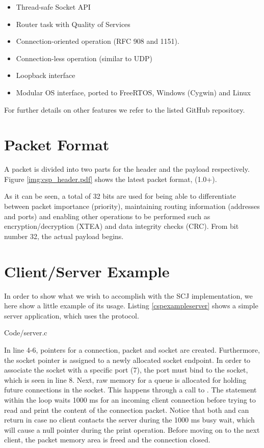\begin{itemize}
	\item Thread-safe Socket API
	\item Router task with Quality of Services
	\item Connection-oriented operation (RFC 908 and 1151).
	\item Connection-less operation (similar to UDP)
	\item Loopback interface
	\item Modular OS interface, ported to FreeRTOS, Windows (Cygwin) and Linux
\end{itemize}

For further details on other features we refer to the listed GitHub repository.

\section{Packet Format}
A packet is divided into two parts for the header and the payload respectively. Figure \ref{img:csp_header.pdf} shows the latest packet format, (1.0+).


As it can be seen, a total of 32 bits are used for being able to differentiate between packet importance (priority), maintaining routing information (addresses and ports) and enabling other operations to be performed such as encryption/decryption (XTEA) and data integrity checks (CRC). From bit number 32, the actual payload begins.

\section{Client/Server Example}
In order to show what we wish to accomplish with the SCJ implementation, we here show a little example of its usage. Listing \ref{cspexampleserver} shows a simple server application, which uses the protocol. 


{Code/server.c}

In line 4-6, pointers for a connection, packet and socket are created. Furthermore, the socket pointer is assigned to a newly allocated socket endpoint. In order to associate the socket with a specific port (7), the port must bind to the socket, which is seen in line 8. Next, raw memory for a queue is allocated for holding future connections in the socket. This happens through a call to . The  statement within the loop waits 1000 ms for an incoming client connection before trying to read and print the content of the connection packet. Notice that both  and  can return  in case no client contacts the server during the 1000 ms busy wait, which will cause a null pointer during the print operation. Before moving on to the next client, the packet memory area is freed and the connection closed. 

